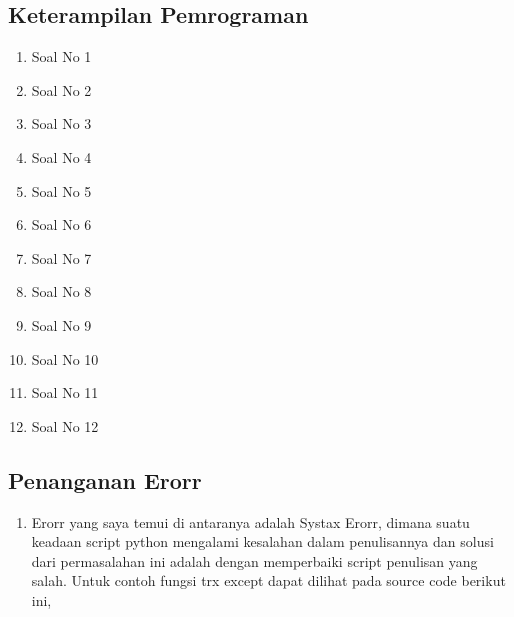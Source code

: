 \subsection{Keterampilan Pemrograman}
\begin{enumerate}

\item Soal No 1 

\item Soal No 2 

\item Soal No 3 

\item Soal No 4 

\item Soal No 5 

\item Soal No 6 

\item Soal No 7 

\item Soal No 8 

\item Soal No 9 

\item Soal No 10 

\item Soal No 11 

\item Soal No 12 
\end{enumerate}

\subsection{Penanganan Erorr}
\begin{enumerate}

\item Erorr yang saya temui di antaranya adalah Systax Erorr, dimana suatu keadaan script python mengalami kesalahan dalam penulisannya dan solusi dari permasalahan ini adalah dengan memperbaiki script penulisan yang salah. Untuk contoh fungsi trx except dapat dilihat pada source code berikut ini,

	

\end{enumerate}
